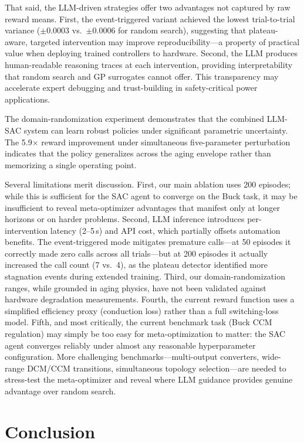 \documentclass[11pt,a4paper]{article}
\begin{document}
That said, the LLM-driven strategies offer two advantages not captured by raw
reward means. First, the event-triggered variant achieved the lowest
trial-to-trial variance ($\pm$0.0003 vs.\ $\pm$0.0006 for random search), suggesting
that plateau-aware, targeted intervention may improve reproducibility---a property
of practical value when deploying trained controllers to hardware. Second, the
LLM produces human-readable reasoning traces at each intervention, providing
interpretability that random search and GP surrogates cannot offer. This
transparency may accelerate expert debugging and trust-building in
safety-critical power applications.

The domain-randomization experiment demonstrates that the combined LLM-SAC
system can learn robust policies under significant parametric uncertainty.
The 5.9$\times$ reward improvement under simultaneous five-parameter
perturbation indicates that the policy generalizes across the aging envelope
rather than memorizing a single operating point.

Several limitations merit discussion.
First, our main ablation uses 200 episodes; while this is sufficient for
the SAC agent to converge on the Buck task, it may be insufficient to reveal
meta-optimizer advantages that manifest only at longer horizons or on harder
problems. Second, LLM inference introduces per-intervention latency (2--5\,s)
and API cost, which partially offsets automation benefits. The event-triggered
mode mitigates premature calls---at 50 episodes it correctly made zero calls
across all trials---but at 200 episodes it actually increased the call count
(7 vs.\ 4), as the plateau detector identified more stagnation events during
extended training. Third, our domain-randomization ranges, while grounded in
aging physics, have not been validated against hardware degradation
measurements. Fourth, the current reward function uses a simplified efficiency
proxy (conduction loss) rather than a full switching-loss model. Fifth, and
most critically, the current benchmark task (Buck CCM regulation) may simply
be too easy for meta-optimization to matter: the SAC agent converges reliably
under almost any reasonable hyperparameter configuration. More challenging
benchmarks---multi-output converters, wide-range DCM/CCM transitions,
simultaneous topology selection---are needed to stress-test the meta-optimizer
and reveal where LLM guidance provides genuine advantage over random search.

\section{Conclusion}
\end{document}
